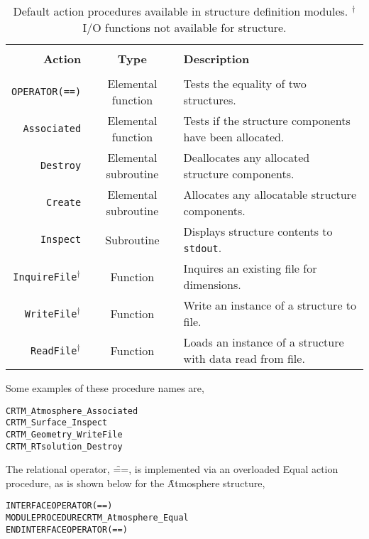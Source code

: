 \begin{table}[htp]
  \centering
  \begin{tabular}{r c l}
    \hline\\[-0.1cm]
    \sffamily\textbf{Action} & \sffamily\textbf{Type} & \sffamily\textbf{Description} \\
    \hline\hline\\[-0.2cm]
    \texttt{OPERATOR(==)}             & Elemental function   & Tests the equality of two structures. \\
    \texttt{Associated}               & Elemental function   & Tests if the structure components have been allocated. \\
    \texttt{Destroy}                  & Elemental subroutine & Deallocates any allocated structure components. \\
    \texttt{Create}                   & Elemental subroutine & Allocates any allocatable structure components. \\
    \texttt{Inspect}                  & Subroutine           & Displays structure contents to \texttt{stdout}. \\
    \texttt{InquireFile}$^{\dagger}$  & Function             & Inquires an existing file for dimensions. \\
    \texttt{WriteFile}$^{\dagger}$    & Function             & Write an instance of a structure to file. \\
    \texttt{ReadFile}$^{\dagger}$     & Function             & Loads an instance of a structure with data read from file. \\
  \hline
  \end{tabular}
  \caption{Default action procedures available in structure definition modules. $^{\dagger}$ I/O functions not available for \ChannelInfo structure.}
  \label{tab:definition_module_default_procedures}
\end{table}

Some examples of these procedure names are,

\begin{alltt}
  CRTM_Atmosphere_Associated
  CRTM_Surface_Inspect
  CRTM_Geometry_WriteFile
  CRTM_RTsolution_Destroy\end{alltt}

The relational operator, \f{==}, is implemented via an overloaded \f{Equal} action procedure, as is shown below for the \f{Atmosphere} structure,

\begin{alltt}
  INTERFACE OPERATOR(==)
    MODULE PROCEDURE CRTM_Atmosphere_Equal
  END INTERFACE OPERATOR(==)\end{alltt}

